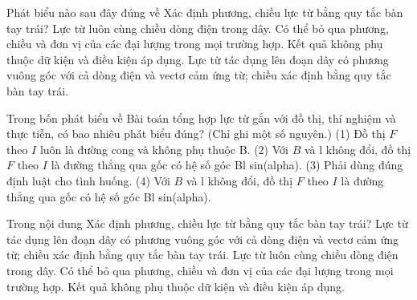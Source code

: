 \begin{ex}
Phát biểu nào sau đây đúng về Xác định phương, chiều lực từ bằng quy tắc bàn tay trái?
\choice
{Lực từ luôn cùng chiều dòng điện trong dây.}
{Có thể bỏ qua phương, chiều và đơn vị của các đại lượng trong mọi trường hợp.}
{Kết quả không phụ thuộc dữ kiện và điều kiện áp dụng.}
{\True Lực từ tác dụng lên đoạn dây có phương vuông góc với cả dòng điện và vectơ cảm ứng từ; chiều xác định bằng quy tắc bàn tay trái.}
\end{ex}

\begin{ex}
Trong bốn phát biểu về Bài toán tổng hợp lực từ gắn với đồ thị, thí nghiệm và thực tiễn, có bao nhiêu phát biểu đúng? (Chỉ ghi một số nguyên.) (1) Đồ thị $F$ theo $I$ luôn là đường cong và không phụ thuộc B. (2) Với $B$ và l không đổi, đồ thị $F$ theo $I$ là đường thẳng qua gốc có hệ số góc Bl sin(alpha). (3) Phải dùng đúng định luật cho tình huống. (4) Với $B$ và l không đổi, đồ thị $F$ theo $I$ là đường thẳng qua gốc có hệ số góc Bl sin(alpha).
\end{ex}

\begin{ex}
Trong nội dung Xác định phương, chiều lực từ bằng quy tắc bàn tay trái?
\choice
{\True Lực từ tác dụng lên đoạn dây có phương vuông góc với cả dòng điện và vectơ cảm ứng từ; chiều xác định bằng quy tắc bàn tay trái.}
{Lực từ luôn cùng chiều dòng điện trong dây.}
{Có thể bỏ qua phương, chiều và đơn vị của các đại lượng trong mọi trường hợp.}
{Kết quả không phụ thuộc dữ kiện và điều kiện áp dụng.}
\end{ex}

